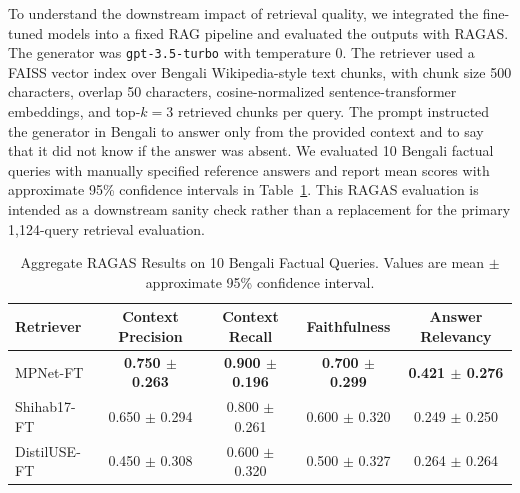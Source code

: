 \documentclass[manuscript,screen,review]{acmart}
\begin{document}
To understand the downstream impact of retrieval quality, we integrated the fine-tuned models into a fixed RAG pipeline and evaluated the outputs with RAGAS. The generator was \texttt{gpt-3.5-turbo} with temperature 0. The retriever used a FAISS vector index over Bengali Wikipedia-style text chunks, with chunk size 500 characters, overlap 50 characters, cosine-normalized sentence-transformer embeddings, and top-$k=3$ retrieved chunks per query. The prompt instructed the generator in Bengali to answer only from the provided context and to say that it did not know if the answer was absent. We evaluated 10 Bengali factual queries with manually specified reference answers and report mean scores with approximate 95\% confidence intervals in Table~\ref{tab:ragas_aggregate}. This RAGAS evaluation is intended as a downstream sanity check rather than a replacement for the primary 1,124-query retrieval evaluation.

\begin{table}[t]
    \centering
    \caption{Aggregate RAGAS Results on 10 Bengali Factual Queries. Values are mean $\pm$ approximate 95\% confidence interval.}
    \label{tab:ragas_aggregate}
    \small
    \begin{tabular}{lcccc}
        \toprule
        \textbf{Retriever} & \textbf{Context Precision} & \textbf{Context Recall} & \textbf{Faithfulness} & \textbf{Answer Relevancy} \\
        \midrule
        MPNet-FT & \textbf{0.750 $\pm$ 0.263} & \textbf{0.900 $\pm$ 0.196} & \textbf{0.700 $\pm$ 0.299} & \textbf{0.421 $\pm$ 0.276} \\
        Shihab17-FT & 0.650 $\pm$ 0.294 & 0.800 $\pm$ 0.261 & 0.600 $\pm$ 0.320 & 0.249 $\pm$ 0.250 \\
        DistilUSE-FT & 0.450 $\pm$ 0.308 & 0.600 $\pm$ 0.320 & 0.500 $\pm$ 0.327 & 0.264 $\pm$ 0.264 \\
        \bottomrule
    \end{tabular}
\end{table}
\end{document}
